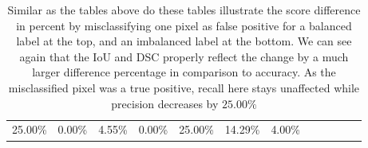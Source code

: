 \begin{table}[H]
{\begin{tabular}{llllllllllll}
      \multicolumn{1}{l|}{25.00\%} &
      \multicolumn{1}{l|}{0.00\%} &
      \multicolumn{1}{l|}{4.55\%} &
      \multicolumn{1}{l|}{0.00\%} &
      \multicolumn{1}{l|}{25.00\%} &
      \multicolumn{1}{l|}{14.29\%} &
      \multicolumn{1}{l|}{4.00\%} &
       &
       &
       &
       \\ \cline{1-8}
    \end{tabular}%
    }
    \caption[Metric comparison - False positive misclassification]{Similar as the tables above do these tables illustrate the score difference in percent by misclassifying one pixel as false positive for a balanced label at the top, and an imbalanced label at the bottom. We can see again that the \ac{IoU} and \ac{DSC} properly reflect the change by a much larger difference percentage in comparison to accuracy. As the misclassified pixel was a true positive, recall here stays unaffected while precision decreases by $25.00\%$}
    \label{tab:metric_comparison_2}
    \end{table}